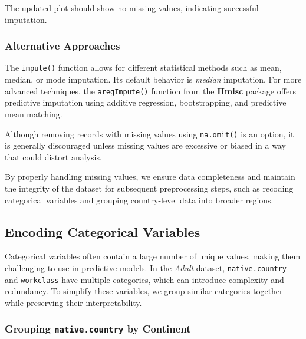 \documentclass[
]{book}
\newcommand{\passthrough}[1]{#1}
\theoremstyle{definition}
\theoremstyle{definition}
\theoremstyle{definition}
\theoremstyle{definition}
\theoremstyle{remark}
\begin{document}
The updated plot should show no missing values, indicating successful imputation.

\subsubsection*{Alternative Approaches}\label{alternative-approaches}

The \passthrough{\lstinline!impute()!} function allows for different statistical methods such as mean, median, or mode imputation. Its default behavior is \emph{median} imputation. For more advanced techniques, the \passthrough{\lstinline!aregImpute()!} function from the \textbf{Hmisc} package offers predictive imputation using additive regression, bootstrapping, and predictive mean matching.

Although removing records with missing values using \passthrough{\lstinline!na.omit()!} is an option, it is generally discouraged unless missing values are excessive or biased in a way that could distort analysis.

By properly handling missing values, we ensure data completeness and maintain the integrity of the dataset for subsequent preprocessing steps, such as recoding categorical variables and grouping country-level data into broader regions.

\subsection{Encoding Categorical Variables}\label{encoding-categorical-variables}

Categorical variables often contain a large number of unique values, making them challenging to use in predictive models. In the \emph{Adult} dataset, \passthrough{\lstinline!native.country!} and \passthrough{\lstinline!workclass!} have multiple categories, which can introduce complexity and redundancy. To simplify these variables, we group similar categories together while preserving their interpretability.

\subsubsection*{\texorpdfstring{Grouping \texttt{native.country} by Continent}{Grouping native.country by Continent}}\label{grouping-native.country-by-continent}
\end{document}
